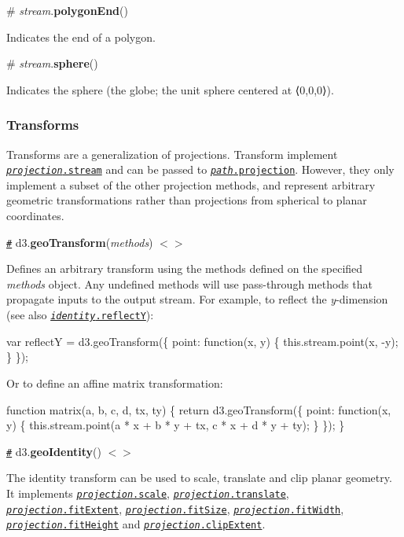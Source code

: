 \label{_stream_polygonEnd}%
\# {\itshape stream}.{\bfseries polygon\+End}()

Indicates the end of a polygon.

\label{_stream_sphere}%
\# {\itshape stream}.{\bfseries sphere}()

Indicates the sphere (the globe; the unit sphere centered at ⟨0,0,0⟩).

\subsubsection*{Transforms}

Transforms are a generalization of projections. Transform implement \href{#projection_stream}{\tt {\itshape projection}.stream} and can be passed to \href{#path_projection}{\tt {\itshape path}.projection}. However, they only implement a subset of the other projection methods, and represent arbitrary geometric transformations rather than projections from spherical to planar coordinates.

\href{#geoTransform}{\tt \#} d3.{\bfseries geo\+Transform}({\itshape methods}) \href{https://github.com/d3/d3-geo/blob/master/src/transform.js#L7}{\tt $<$$>$}

Defines an arbitrary transform using the methods defined on the specified {\itshape methods} object. Any undefined methods will use pass-\/through methods that propagate inputs to the output stream. For example, to reflect the {\itshape y}-\/dimension (see also \href{#identity_reflectY}{\tt {\itshape identity}.reflectY})\+:


\begin{DoxyCode}
var reflectY = d3.geoTransform(\{
  point: function(x, y) \{
    this.stream.point(x, -y);
  \}
\});
\end{DoxyCode}


Or to define an affine matrix transformation\+:


\begin{DoxyCode}
function matrix(a, b, c, d, tx, ty) \{
  return d3.geoTransform(\{
    point: function(x, y) \{
      this.stream.point(a * x + b * y + tx, c * x + d * y + ty);
    \}
  \});
\}
\end{DoxyCode}


\href{#geoIdentity}{\tt \#} d3.{\bfseries geo\+Identity}() \href{https://github.com/d3/d3-geo/blob/master/src/projection/identity.js}{\tt $<$$>$}

The identity transform can be used to scale, translate and clip planar geometry. It implements \href{#projection_scale}{\tt {\itshape projection}.scale}, \href{#projection_translate}{\tt {\itshape projection}.translate}, \href{#projection_fitExtent}{\tt {\itshape projection}.fit\+Extent}, \href{#projection_fitSize}{\tt {\itshape projection}.fit\+Size}, \href{#projection_fitWidth}{\tt {\itshape projection}.fit\+Width}, \href{#projection_fitHeight}{\tt {\itshape projection}.fit\+Height} and \href{#projection_clipExtent}{\tt {\itshape projection}.clip\+Extent}.

